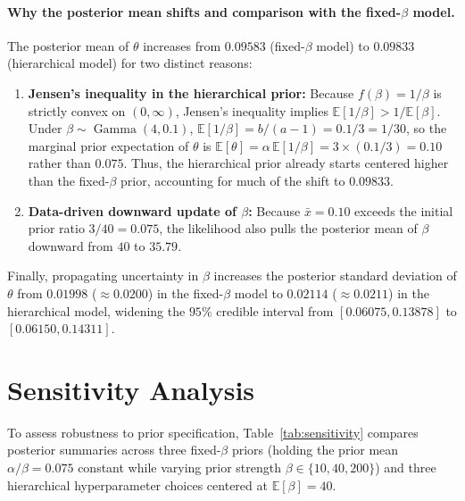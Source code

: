 \documentclass[11pt,a4paper]{article}
\begin{document}
\paragraph{Why the posterior mean shifts and comparison with the fixed-$\beta$ model.}
The posterior mean of $\theta$ increases from $0.09583$ (fixed-$\beta$ model) to $0.09833$ (hierarchical model) for two distinct reasons:
\begin{enumerate}
    \item \textbf{Jensen's inequality in the hierarchical prior:} Because $f(\beta) = 1/\beta$ is strictly convex on $(0, \infty)$, Jensen's inequality implies $\mathbb{E}[1/\beta] > 1/\mathbb{E}[\beta]$. Under $\beta \sim \operatorname{Gamma}(4, 0.1)$, $\mathbb{E}[1/\beta] = b/(a - 1) = 0.1/3 = 1/30$, so the marginal prior expectation of $\theta$ is $\mathbb{E}[\theta] = \alpha\,\mathbb{E}[1/\beta] = 3 \times (0.1/3) = \mathbf{0.10}$ rather than $0.075$. Thus, the hierarchical prior already starts centered higher than the fixed-$\beta$ prior, accounting for much of the shift to $0.09833$.
    \item \textbf{Data-driven downward update of $\beta$:} Because $\bar{x} = 0.10$ exceeds the initial prior ratio $3/40 = 0.075$, the likelihood also pulls the posterior mean of $\beta$ downward from $40$ to $35.79$.
\end{enumerate}
Finally, propagating uncertainty in $\beta$ increases the posterior standard deviation of $\theta$ from $0.01998$ ($\approx 0.0200$) in the fixed-$\beta$ model to $0.02114$ ($\approx 0.0211$) in the hierarchical model, widening the $95\%$ credible interval from $[0.06075, 0.13878]$ to $[0.06150, 0.14311]$.

\section*{Sensitivity Analysis}

To assess robustness to prior specification, Table~\ref{tab:sensitivity} compares posterior summaries across three fixed-$\beta$ priors (holding the prior mean $\alpha/\beta = 0.075$ constant while varying prior strength $\beta \in \{10, 40, 200\}$) and three hierarchical hyperparameter choices centered at $\mathbb{E}[\beta] = 40$.
\end{document}
